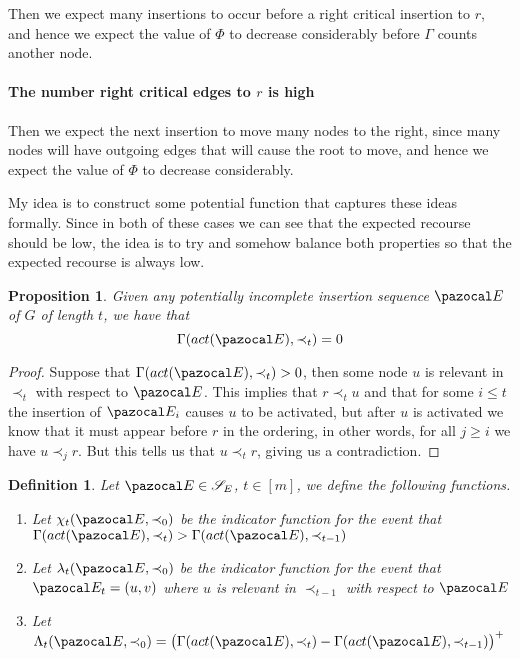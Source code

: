 \documentclass{report}
\newtheorem{proposition}{Proposition}
\newtheorem{definition}{Definition}
\begin{document}
Then we expect many insertions to occur before a right critical insertion to $r$, and hence we expect the value of $\Phi$ to decrease considerably before $\Gamma$ counts another node.

\paragraph{The number right critical edges to $r$ is high}

Then we expect the next insertion to move many nodes to the right, since many nodes will have outgoing edges that will cause the root to move, and hence we expect the value of $\Phi$ to decrease considerably.

My idea is to construct some potential function that captures these ideas formally. Since in both of these cases we can see that the expected recourse should be low, the idea is to try and somehow balance both properties so that the expected recourse is always low.

\begin{proposition}
Given any potentially incomplete insertion sequence $\pazocal E$ of $G$ of length $t$, we have that
\[ \Gamma(act(\pazocal E),\prec_t) = 0 \]
\end{proposition}

\begin{proof}
Suppose that $\Gamma(act(\pazocal E),\prec_t) > 0$, then some node $u$ is relevant in $\prec_t$ with respect to $\pazocal E$. This implies that $r \prec_t u$ and that for some $i \leq t$ the insertion of $\pazocal E_i$ causes $u$ to be activated, but after $u$ is activated we know that it must appear before $r$ in the ordering, in other words, for all $j \geq i$ we have $u \prec_j r$. But this tells us that $u \prec_t r$, giving us a contradiction.
\end{proof}

\begin{definition}
Let $\pazocal E \in \mathcal S_E$, $t \in [m]$, we define the following functions.

\begin{enumerate}
    \item Let $\chi_t(\pazocal E, \prec_0)$ be the indicator function for the event that $\Gamma(act(\pazocal E), \prec_{t}) > \Gamma(act(\pazocal E), \prec_{t-1})$
    \item Let $\lambda_t(\pazocal E, \prec_0)$ be the indicator function for the event that $\pazocal E_{t}=(u,v)$ where $u$ is relevant in $\prec_{t-1}$ with respect to $\pazocal E$
    \item Let $\Lambda_t(\pazocal E, \prec_0) = \big(\Gamma(act(\pazocal E), \prec_{t}) - \Gamma(act(\pazocal E), \prec_{t-1})\big)^+$
\end{enumerate}

\end{definition}
\end{document}
